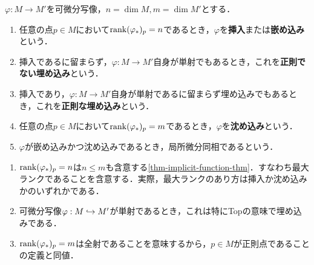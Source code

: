 \documentclass[uplatex,dvipdfmx]{jsreport}
\begin{document}
\begin{definition}
    $\varphi:M\to M'$を可微分写像，$n=\dim M,m=\dim M'$とする．
    \begin{enumerate}
        \item 任意の点$p\in M$において$\mathrm{rank}(\varphi_*)_p=n$であるとき，$\varphi$を\textbf{挿入}または\textbf{嵌め込み}という．
        \item 挿入であるに留まらず，$\varphi:M\to M'$自身が単射でもあるとき，これを\textbf{正則でない埋め込み}という．
        \item 挿入であり，$\varphi:M\to M'$自身が単射であるに留まらず埋め込みでもあるとき，これを\textbf{正則な埋め込み}という．
        \item 任意の点$p\in M$において$\mathrm{rank}(\varphi_*)_p=m$であるとき，$\varphi$を\textbf{沈め込み}という．
        \item $\varphi$が嵌め込みかつ沈め込みであるとき，局所微分同相であるという．
    \end{enumerate}
\end{definition}
\begin{remark}\mbox{}
    \begin{enumerate}
        \item $\mathrm{rank}(\varphi_*)_p=n$は$n\le m$も含意する\ref{thm-implicit-function-thm}．すなわち最大ランクであることを含意する．実際，最大ランクのあり方は挿入か沈め込みかのいずれかである．
        \item 可微分写像$\varphi:M\hookrightarrow M'$が単射であるとき，これは特にTopの意味で埋め込みである．
        \item $\mathrm{rank}(\varphi_*)_p=m$は全射であることを意味するから，$p\in M$が正則点であることの定義と同値．
    \end{enumerate}
\end{remark}
\end{document}
